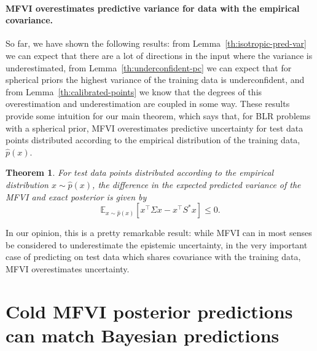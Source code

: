 \documentclass{article}
\theoremstyle{plain}
\newtheorem{theorem}{Theorem}[section]
\theoremstyle{definition}
\theoremstyle{remark}
\theoremstyle{plain}
\newcommand{\expectation}[2]{\mathbb{E}_{#1}\left[#2\right]}
\newcommand{\posterior}{\Sigma}
\begin{document}
\paragraph{MFVI overestimates predictive variance for data with the empirical covariance.}
So far, we have shown the following results: from Lemma~\ref{th:isotropic-pred-var} we can expect that there are a lot of directions in the input where the variance is underestimated, from Lemma~\ref{th:underconfident-pc} we can expect that for spherical priors the highest variance of the training data is underconfident, and from Lemma~\ref{th:calibrated-points} we know that the degrees of this overestimation and underestimation are coupled in some way. These results provide some intuition for our main theorem, which says that, for BLR problems with a spherical prior, MFVI overestimates predictive uncertainty for test data points distributed according to the empirical distribution of the training data, $\hat p(x)$. 
\begin{theorem} \label{th:empirical_pred_var} 
For test data points distributed according to  the empirical distribution $x\sim \hat p(x)$, the difference in the expected predicted variance of the MFVI and exact posterior is given by 
    \begin{equation}
        \expectation{x\sim \hat p (x)}{x^\top \posterior x -  x^\top S^*  x }  \leq 0 . 
    \end{equation}
\end{theorem}


In our opinion, this is a pretty remarkable result: while MFVI can in most senses be considered to underestimate the epistemic uncertainty, in the very important case of predicting on test data which shares covariance with the training data, MFVI overestimates uncertainty. 

\section{Cold MFVI posterior predictions can match Bayesian predictions}
\label{sec:cold_posterior}
\end{document}
